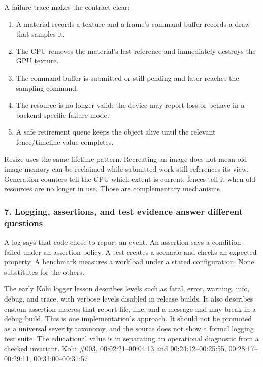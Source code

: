 A failure trace makes the contract clear:

\begin{enumerate}
\def\labelenumi{\arabic{enumi}.}
\tightlist
\item
  A material records a texture and a frame's command buffer records a draw that samples it.
\item
  The CPU removes the material's last reference and immediately destroys the GPU texture.
\item
  The command buffer is submitted or still pending and later reaches the sampling command.
\item
  The resource is no longer valid; the device may report loss or behave in a backend-specific failure mode.
\item
  A safe retirement queue keeps the object alive until the relevant fence/timeline value completes.
\end{enumerate}

Resize uses the same lifetime pattern. Recreating an image does not mean old image memory can be reclaimed while submitted work still references its view. Generation counters tell the CPU which extent is current; fences tell it when old resources are no longer in use. Those are complementary mechanisms.

\subsubsection{7. Logging, assertions, and test evidence answer different questions}\label{logging-assertions-and-test-evidence-answer-different-questions}

A log says that code chose to report an event. An assertion says a condition failed under an assertion policy. A test creates a scenario and checks an expected property. A benchmark measures a workload under a stated configuration. None substitutes for the others.

The early Kohi logger lesson describes levels such as fatal, error, warning, info, debug, and trace, with verbose levels disabled in release builds. It also describes custom assertion macros that report file, line, and a message and may break in a debug build. This is one implementation's approach. It should not be promoted as a universal severity taxonomy, and the source does not show a formal logging test suite. The educational value is in separating an operational diagnostic from a checked invariant. \href{https://www.youtube.com/watch?v=l9e8PJskYnI&t=2m21s}{Kohi \#003, 00:02:21--00:04:13 and 00:24:12--00:25:55, 00:28:17--00:29:11, 00:31:00--00:31:57}

